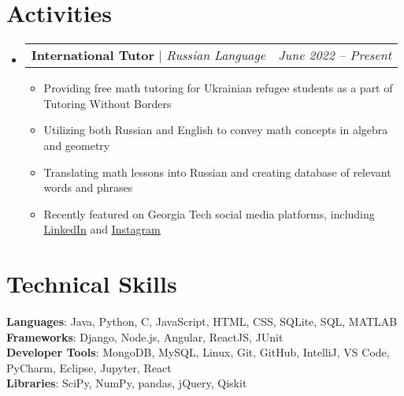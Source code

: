 \documentclass[letterpaper,11pt]{article}
\makeatletter
\newcommand{\resumeItem}[1]{
  \item\small{
    {#1 \vspace{-2pt}}
  }
}
\newcommand{\resumeProjectHeading}[2]{
    \item
    \begin{tabular*}{0.97\textwidth}{l@{\extracolsep{\fill}}r}
      \small#1 & #2 \\
    \end{tabular*}\vspace{-7pt}
}
\newcommand{\resumeSubHeadingListStart}{\begin{itemize}[leftmargin=0.15in, label={}]}
\newcommand{\resumeSubHeadingListEnd}{\end{itemize}}
\newcommand{\resumeItemListStart}{\begin{itemize}}
\newcommand{\resumeItemListEnd}{\end{itemize}\vspace{-5pt}}
\makeatother
\begin{document}
\section{Activities}
    \resumeSubHeadingListStart
      \resumeProjectHeading
          {\textbf{International Tutor} $|$ \emph{Russian Language}}{\emph{June 2022 -- Present}}
          \resumeItemListStart
            \resumeItem{Providing free math tutoring for Ukrainian refugee students as a part of Tutoring Without Borders}
            \resumeItem{Utilizing both Russian and English to convey math concepts in algebra and geometry}
            \resumeItem{Translating math lessons into Russian and creating database of relevant words and phrases}
            \resumeItem{Recently featured on Georgia Tech social media platforms, including \href{https://www.linkedin.com/feed/update/urn:li:activity:7151242009431740416/}{\underline{LinkedIn}} and \href{https://www.instagram.com/p/C19vISVuBfw/?img_index=1/}{\underline{Instagram}}}
          \resumeItemListEnd
    \resumeSubHeadingListEnd


%
\section{Technical Skills}
 \begin{itemize}[leftmargin=0.15in, label={}]
    \small{\item{
     \textbf{Languages}{: Java, Python, C, JavaScript, HTML, CSS, SQLite, SQL, MATLAB} \\
     \textbf{Frameworks}{: Django, Node.js, Angular, ReactJS, JUnit} \\
     \textbf{Developer Tools}{: MongoDB, MySQL, Linux, Git, GitHub, IntelliJ, VS Code, PyCharm, Eclipse, Jupyter, React} \\
     \textbf{Libraries}{: SciPy, NumPy, pandas, jQuery, Qiskit}
    }}
 \end{itemize}


\end{document}
